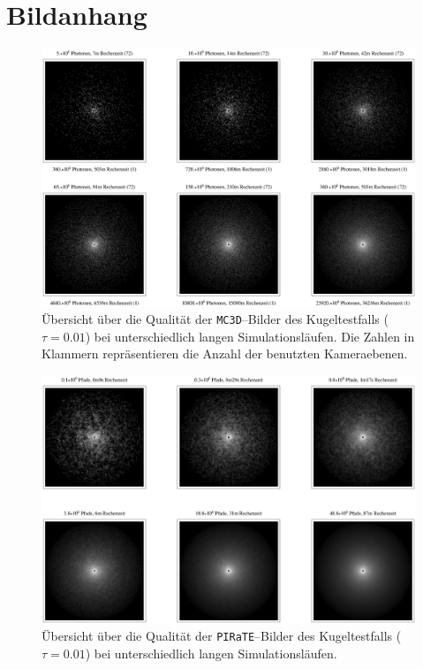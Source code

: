 \documentclass[
	12pt,
	a4paper,
	pagesize=auto,
	DIV=10,
	parskip=half,
	titlepage,
	twoside,
	listof=totoc,
	bibliography=totocnumbered,
	final%
]{scrbook}
\begin{document}
	\chapter{Bildanhang}
		\begin{figure}
			\centering
			\vspace{-1em}
			\includegraphics[angle=90,height=1.0\textheight]{mc3dsphereimageoverview1.eps}
			\caption{Übersicht über die Qualität der \texttt{MC3D}--Bilder des Kugeltestfalls ($\tau=0.01$) bei unterschiedlich langen Simulationsläufen. Die Zahlen in Klammern repräsentieren die Anzahl der benutzten Kameraebenen.}
			\label{fig:mc3dsphere_image_overview1}
		\end{figure}
		\begin{figure}
			\centering
			\vspace{-1em}
			\includegraphics[angle=90,height=1.0\textheight]{piratesphereimageoverview1.eps}
			\caption{Übersicht über die Qualität der \texttt{PIRaTE}--Bilder des Kugeltestfalls ($\tau=0.01$) bei unterschiedlich langen Simulationsläufen.}
			\label{fig:piratesphere_image_overview1}
		\end{figure}
		
\end{document}
